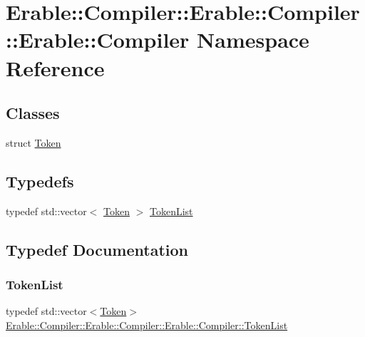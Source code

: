 \hypertarget{namespace_erable_1_1_compiler_1_1_erable_1_1_compiler_1_1_erable_1_1_compiler}{}\section{Erable\+::Compiler\+::Erable\+::Compiler\+::Erable\+::Compiler Namespace Reference}
\label{namespace_erable_1_1_compiler_1_1_erable_1_1_compiler_1_1_erable_1_1_compiler}
\subsection*{Classes}
\begin{DoxyCompactItemize}
\item 
struct \mbox{\hyperlink{struct_erable_1_1_compiler_1_1_erable_1_1_compiler_1_1_erable_1_1_compiler_1_1_token}{Token}}
\end{DoxyCompactItemize}
\subsection*{Typedefs}
\begin{DoxyCompactItemize}
\item 
typedef std\+::vector$<$ \mbox{\hyperlink{struct_erable_1_1_compiler_1_1_erable_1_1_compiler_1_1_erable_1_1_compiler_1_1_token}{Token}} $>$ \mbox{\hyperlink{namespace_erable_1_1_compiler_1_1_erable_1_1_compiler_1_1_erable_1_1_compiler_a19186c171be4ed9d4232bd73c425df77}{Token\+List}}
\end{DoxyCompactItemize}


\subsection{Typedef Documentation}
\mbox{\label{namespace_erable_1_1_compiler_1_1_erable_1_1_compiler_1_1_erable_1_1_compiler_a19186c171be4ed9d4232bd73c425df77}} 
\subsubsection{\texorpdfstring{TokenList}{TokenList}}
{\footnotesize\ttfamily typedef std\+::vector$<$\mbox{\hyperlink{struct_erable_1_1_compiler_1_1_erable_1_1_compiler_1_1_erable_1_1_compiler_1_1_token}{Token}}$>$ \mbox{\hyperlink{namespace_erable_1_1_compiler_1_1_erable_1_1_compiler_1_1_erable_1_1_compiler_a19186c171be4ed9d4232bd73c425df77}{Erable\+::\+Compiler\+::\+Erable\+::\+Compiler\+::\+Erable\+::\+Compiler\+::\+Token\+List}}}

